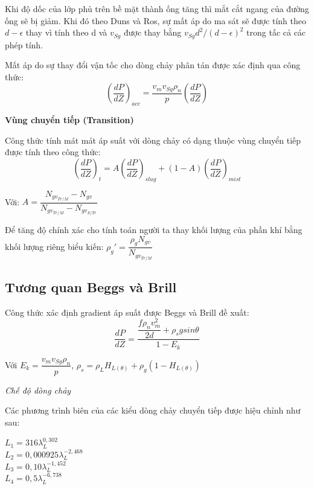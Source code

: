 \documentclass[12pt,a4paper]{report}
\begin{document}
Khi độ dốc của lớp phủ trên bề mặt thành ống tăng thì mắt cắt ngang của đường ống sẽ bị giảm. Khi đó theo Duns và Ros, sự mất áp do ma sát sẽ được tính theo $d-\epsilon$ thay vì tính theo d và $v_{Sg}$ được thay bằng $v_{Sg}d^2/(d-\epsilon)^2$ trong tấc cả các phép tính.

Mất áp do sự thay đổi vận tốc cho dòng chảy phân tán được xác định qua công thức:
   \begin{equation}
   \left(\dfrac{dP}{dZ}\right)_{acc}= \dfrac{v_mv_{Sg}\rho_n}{p} \left(\dfrac{dP}{dZ}\right)
    \end{equation}

\textbf{Vùng chuyển tiếp (Transition)}

Công thức tính mát mát áp suất với dòng chảy có dạng thuộc vùng chuyển tiếp được tính theo công thức:
   	\begin{equation}
   		\left(\dfrac{dP}{dZ}\right)_{t}= A\left(\dfrac{dP}{dZ}\right)_{slug}+(1-A)\left(\dfrac{dP}{dZ}\right)_{mist}
	\end{equation}
    
    
Với: $A = \dfrac{N_{gv_{Tr/M}}-N_{gv}}{N_{gv_{Tr/M}}-N_{gv_{S/Tr}}}$

Để tăng độ chính xác cho tính toán người ta thay khối lượng của phần khí bằng khối lượng riêng biểu kiến: $\rho_g'=\dfrac{\rho_gN_{gv}}{N_{gv_{Tr/M}}}$\\

\subsection{Tương quan Beggs và Brill}

Công thức xác định gradient áp suất được Beggs và Brill đề xuất:
	\begin{equation}
   		\dfrac{dP}{dZ}= \dfrac{\dfrac{f\rho_nv_m^2}{2d}+\rho_sgsin\theta}{1-E_k}
    \end{equation}

Với $E_k=\dfrac{v_mv_{Sg}\rho_n}{p}$, $\rho_s=\rho_LH_{L(\theta)}+\rho_g(1-H_{L(\theta)})$

\textit{Chế độ dòng chảy}

Các phương trình biên của các kiểu dòng chảy chuyển tiếp được hiệu chỉnh như sau:

$L_1=316\lambda_L^{0,302}$\\
$L_2=0,000925\lambda_L^{-2,468}$\\
$L_3=0,10\lambda_L^{-1,452}$\\
$L_4=0,5\lambda_L^{-6,738}$
\end{document}
